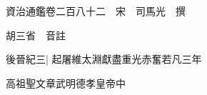 






























































資治通鑑卷二百八十二　宋　司馬光　撰

胡三省　音註

後晉紀三|{
	起屠維太淵獻盡重光赤奮若凡三年}


高祖聖文章武明德孝皇帝中

